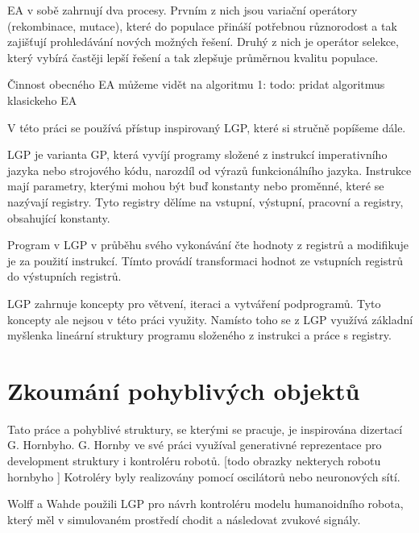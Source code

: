 EA v sobě zahrnují dva procesy.
Prvním z nich jsou variační operátory (rekombinace, mutace), které do populace přináší potřebnou různorodost a tak zajišťují prohledávání nových možných řešení.
Druhý z nich je operátor selekce, který vybírá častěji lepší řešení a tak zlepšuje průměrnou kvalitu populace.

Činnost obecného EA můžeme vidět na algoritmu 1:
todo: pridat algoritmus klasickeho EA

V této práci se používá přístup inspirovaný LGP, které si stručně popíšeme dále.

LGP je varianta GP, která vyvíjí programy složené z instrukcí imperativního jazyka nebo strojového kódu, narozdíl od výrazů funkcionálního jazyka.
Instrukce mají parametry, kterými mohou být buď konstanty nebo proměnné, které se nazývají registry.
Tyto registry dělíme na vstupní, výstupní, pracovní a registry, obsahující konstanty.

Program v LGP v průběhu svého vykonávání čte hodnoty z registrů a modifikuje je za použití instrukcí.
Tímto provádí transformaci hodnot ze vstupních registrů do výstupních registrů.

LGP zahrnuje koncepty pro větvení, iteraci a vytváření podprogramů.
Tyto koncepty ale nejsou v této práci využity.
Namísto toho se z LGP využívá základní myšlenka lineární struktury programu složeného z instrukci a práce s registry.




\chapter{Zkoumání pohyblivých objektů}



Tato práce a pohyblivé struktury, se kterými se pracuje, je inspirována dizertací G. Hornbyho.
G. Hornby ve své práci využíval generativné reprezentace pro development struktury i kontroléru robotů.
[todo obrazky nekterych robotu hornbyho ]
Kotroléry byly realizovány pomocí oscilátorů nebo neuronových sítí.

Wolff a Wahde použili LGP pro návrh kontroléru modelu humanoidního robota, který měl v simulovaném prostředí chodit a následovat zvukové signály.

